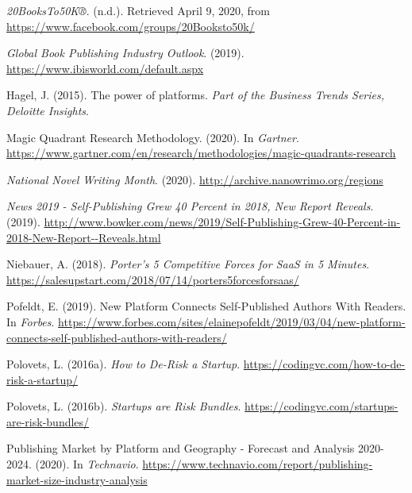 \documentclass[10pt,openany]{book}
\newlength{\cslhangindent}
\newenvironment{cslreferences}%
  {\setlength{\parindent}{0pt}%
  \everypar{\setlength{\hangindent}{\cslhangindent}}\ignorespaces}%
  {\par}
\begin{document}
\hypertarget{refs}{}
\begin{cslreferences}
\leavevmode\hypertarget{ref-noauthor_20booksto50k_nodate}{}%
\emph{20BooksTo50K®}. (n.d.). Retrieved April 9, 2020, from
\url{https://www.facebook.com/groups/20Booksto50k/}

\leavevmode\hypertarget{ref-noauthor_ibisworld_nodate}{}%
\emph{Global Book Publishing Industry Outlook}. (2019).
\url{https://www.ibisworld.com/default.aspx}

\leavevmode\hypertarget{ref-hagel_power_2015}{}%
Hagel, J. (2015). The power of platforms. \emph{Part of the Business
Trends Series, Deloitte Insights}.

\leavevmode\hypertarget{ref-gartner_magic_nodate}{}%
Magic Quadrant Research Methodology. (2020). In \emph{Gartner}.
\url{https://www.gartner.com/en/research/methodologies/magic-quadrants-research}

\leavevmode\hypertarget{ref-noauthor_national_nodate}{}%
\emph{National Novel Writing Month}. (2020).
\url{http://archive.nanowrimo.org/regions}

\leavevmode\hypertarget{ref-bowker_news_nodate}{}%
\emph{News 2019 - Self-Publishing Grew 40 Percent in 2018, New Report
Reveals}. (2019).
\url{http://www.bowker.com/news/2019/Self-Publishing-Grew-40-Percent-in-2018-New-Report--Reveals.html}

\leavevmode\hypertarget{ref-annelise_porters_nodate}{}%
Niebauer, A. (2018). \emph{Porter's 5 Competitive Forces for SaaS in 5
Minutes}.
\url{https://salesupstart.com/2018/07/14/porters5forcesforsaas/}

\leavevmode\hypertarget{ref-pofeldt_new_nodate}{}%
Pofeldt, E. (2019). New Platform Connects Self-Published Authors With
Readers. In \emph{Forbes}.
\url{https://www.forbes.com/sites/elainepofeldt/2019/03/04/new-platform-connects-self-published-authors-with-readers/}

\leavevmode\hypertarget{ref-polovets_how_nodate}{}%
Polovets, L. (2016a). \emph{How to De-Risk a Startup}.
\url{https://codingvc.com/how-to-de-risk-a-startup/}

\leavevmode\hypertarget{ref-polovets_startups_nodate}{}%
Polovets, L. (2016b). \emph{Startups are Risk Bundles}.
\url{https://codingvc.com/startups-are-risk-bundles/}

\leavevmode\hypertarget{ref-technavio_publishing_nodate}{}%
Publishing Market by Platform and Geography - Forecast and Analysis
2020-2024. (2020). In \emph{Technavio}.
\url{https://www.technavio.com/report/publishing-market-size-industry-analysis}


\end{cslreferences}
\end{document}

